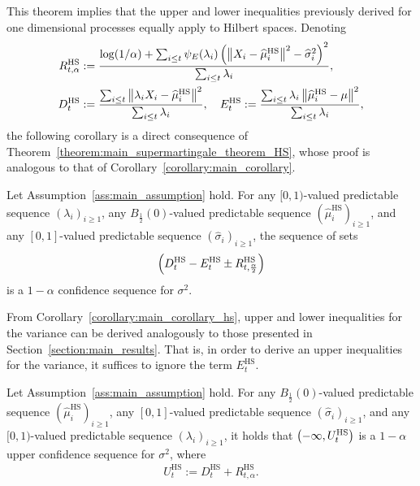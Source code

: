 This theorem implies that the upper and lower inequalities previously derived for one dimensional processes equally apply to Hilbert spaces. Denoting
\begin{align*}
    R_{t, \alpha}^{\text{HS}} &:= \frac{\log(1/\alpha) + \sum_{i \leq t}\psi_E(\lambda_i) \left( \left\| X_i - \widehat\mu_i^{\text{HS}}\right\|^2 - \widehat \sigma_i^2 \right)^2}{\sum_{i \leq t} \lambda_i},
    \\ D_t^{\text{HS}} &:= \frac{\sum_{i \leq t}\left\| \lambda_i X_i - \widehat\mu_i^{\text{HS}}\right\|^2}{\sum_{i \leq t} \lambda_i}, \quad E_t^{\text{HS}} :=  \frac{\sum_{i \leq t} \lambda_i \left\| \widehat\mu_i^{\text{HS}} - \mu\right\|^2}{\sum_{i \leq t} \lambda_i},
\end{align*}
the following corollary is a direct consequence of Theorem~\ref{theorem:main_supermartingale_theorem_HS}, whose proof is analogous to that of Corollary~\ref{corollary:main_corollary}.
\begin{corollary} \label{corollary:main_corollary_hs}
    Let Assumption~\ref{ass:main_assumption} hold.  For any $[0, 1)$-valued predictable sequence $(\lambda_i)_{i \geq 1}$, any $B_{\frac{1}{2}}(0)$-valued predictable sequence $(\widehat\mu_i^{\text{HS}})_{i \geq 1}$, and any $[0, 1]$-valued predictable sequence $(\widehat\sigma_i)_{i \geq 1}$, the sequence of sets
    \begin{align*}
    \left( D_t^{\text{HS}} -  E_t^{\text{HS}} \pm R_{t, \frac{\alpha}{2}}^{\text{HS}}\right)
\end{align*}
is a $1-\alpha$ confidence sequence for $\sigma^2$.
\end{corollary}

From Corollary~\ref{corollary:main_corollary_hs}, upper and lower inequalities for the variance can be derived analogously to those presented in Section~\ref{section:main_results}. That is, in order to derive an upper inequalities for the variance, it suffices to ignore the term $E_t^{\text{HS}}$.

\begin{corollary} 
    Let Assumption~\ref{ass:main_assumption} hold.  For any $B_{\frac{1}{2}}(0)$-valued predictable sequence $(\widehat\mu_i^{\text{HS}})_{i \geq 1}$, any $[0, 1]$-valued predictable sequence $(\widehat\sigma_i)_{i \geq 1}$, and any $[0, 1)$-valued predictable sequence $(\lambda_i)_{i \geq 1}$, it holds that $\left( -\infty, U_t^{\text{HS}}\right)$ is a $1-\alpha$ upper confidence sequence for $\sigma^2$, where
    \begin{align*}
    U_t^{\text{HS}} := D_t^{\text{HS}}+ R_{t, \alpha}^{\text{HS}}.
    \end{align*}
\end{corollary}

